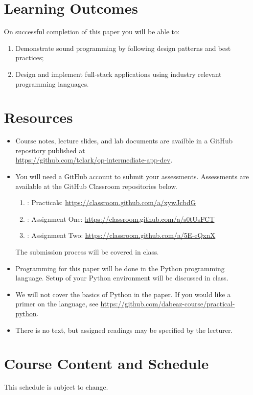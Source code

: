 \documentclass{article}
\begin{document}
\newpage 

\section*{Learning Outcomes}
On successful completion of this paper you will be able to:
\begin{enumerate}
  \item Demonstrate sound programming by following design patterns and best practices;
  \item Design and implement full-stack applications using industry relevant programming languages.
\end{enumerate}

\section*{Resources}
\begin{itemize}
	\item Course notes, lecture slides, and lab documents are availble in a GitHub repository published at \\ \url{https://github.com/tclark/op-intermediate-app-dev}.
	\item You will need a GitHub account to submit your assessments. Assessments are available at the GitHub Classroom repositories below.
	    \begin{enumerate}
	    \item: Practicals: \url{https://classroom.github.com/a/xywJcbdG}
	    \item: Assignment One: \url{https://classroom.github.com/a/s0tUsFCT}
	    \item: Assignment Two: \url{https://classroom.github.com/a/5E-eQxnX}
	  \end{enumerate}
	  The submission process will be covered in class.
	\item Programming for this paper will be done in the Python programming language. Setup of your Python environment will be discussed in class. 
	\item We will not cover the basics of Python in the paper. If you would like a primer on the language, see \url{https://github.com/dabeaz-course/practical-python}.
	\item There is no text, but assigned readings may be specified by the lecturer.     
\end{itemize}

\pagebreak

\section*{Course Content and Schedule}
This schedule is subject to change.
\end{document}
